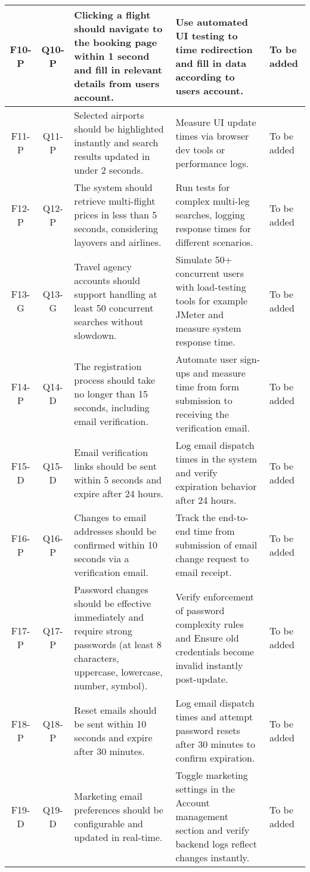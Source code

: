 \begin{longtable}{|c|c|p{4.5cm}|p{3.5cm}|p{3.5cm}|}
    \hline
    F10-P & Q10-P & Clicking a flight should navigate to the booking page within 1 second and fill in relevant details from users account. & Use automated UI testing to time redirection and fill in data according to users account. & To be added \\
    \hline
    F11-P & Q11-P & Selected airports should be highlighted instantly and search results updated in under 2 seconds. & Measure UI update times via browser dev tools or performance logs. & To be added \\
    \hline
    F12-P & Q12-P & The system should retrieve multi-flight prices in less than 5 seconds, considering layovers and airlines. & Run tests for complex multi-leg searches, logging response times for different scenarios. & To be added \\
    \hline
    F13-G & Q13-G & Travel agency accounts should support handling at least 50 concurrent searches without slowdown. & Simulate 50+ concurrent users with load-testing tools for example JMeter and measure system response time. & To be added \\
    \hline
    F14-P & Q14-D & The registration process should take no longer than 15 seconds, including email verification. & Automate user sign-ups and measure time from form submission to receiving the verification email. & To be added \\
    \hline
    F15-D & Q15-D & Email verification links should be sent within 5 seconds and expire after 24 hours. & Log email dispatch times in the system and verify expiration behavior after 24 hours. & To be added \\
    \hline
    F16-P & Q16-P & Changes to email addresses should be confirmed within 10 seconds via a verification email. & Track the end-to-end time from submission of email change request to email receipt. & To be added \\
    \hline
    F17-P & Q17-P & Password changes should be effective immediately and require strong passwords (at least 8 characters, uppercase, lowercase, number, symbol). & Verify enforcement of password complexity rules and Ensure old credentials become invalid instantly post-update. & To be added \\
    \hline
    F18-P & Q18-P & Reset emails should be sent within 10 seconds and expire after 30 minutes. & Log email dispatch times and attempt password resets after 30 minutes to confirm expiration. & To be added \\
    \hline
    F19-D & Q19-D & Marketing email preferences should be configurable and updated in real-time. & Toggle marketing settings in the Account management section and verify backend logs reflect changes instantly. & To be added \\

\end{longtable}
